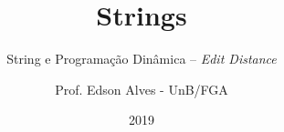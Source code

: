 \title{Strings}
\subtitle{String e Programação Dinâmica -- {\it Edit Distance}}
\author{Prof. Edson Alves - UnB/FGA}
\date{2019}

